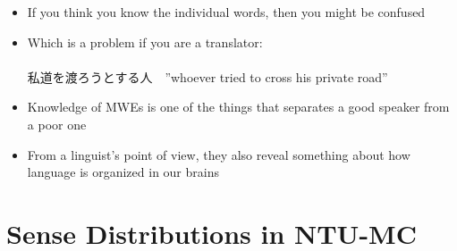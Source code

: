 \documentclass[a4paper,landscape,headrule,footrule,xetex]{foils}
\begin{document}

\begin{itemize}
\item If you think you know the individual words, then you might be  confused

\item Which is a problem if you are a translator:
\\  
\\ 私道を渡ろうとする人　''whoever tried to cross his private road''
\item Knowledge of MWEs is one of the things that separates a good speaker from a poor one
\item From a linguist's point of view, they also reveal something about
  how language is organized in our brains
\end{itemize}

  


\section{Sense Distributions in NTU-MC}

\end{document}
